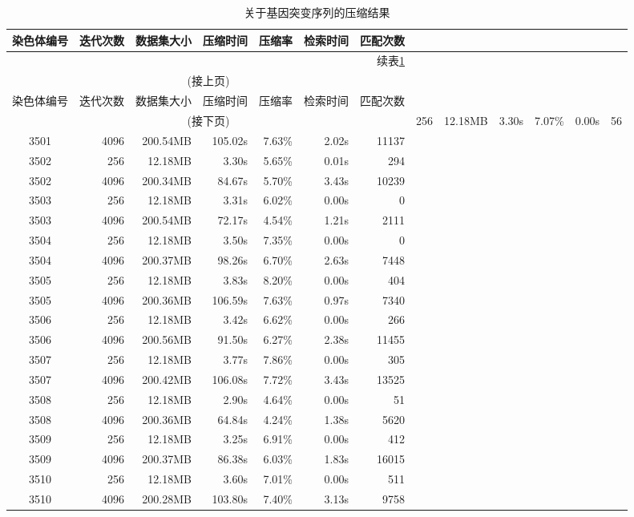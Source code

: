 ﻿\documentclass{sysuthesis}
\begin{document}
\begin{longtable}{crrrrrr}
	\caption{关于基因突变序列的压缩结果}\label{tab:dnacompress}\\
	\hline\hline
	染色体编号 & 迭代次数 & 数据集大小 & 压缩时间 & 压缩率 & 检索时间 & 匹配次数 \\
	\hline
	\endfirsthead
	\multicolumn{7}{r}{续表\ref{tab:dnacompress}}\\
	\multicolumn{7}{c}{(接上页)}\\
	\hline\hline
	染色体编号 & 迭代次数 & 数据集大小 & 压缩时间 & 压缩率 & 检索时间 & 匹配次数 \\
	\hline
	\endhead
	\hline
	\multicolumn{7}{c}{(接下页)}
	\endfoot
	\hline
	\endlastfoot
	3501 & 256 & 12.18MB & 3.30s & 7.07\% & 0.00s & 56 \\
	3501 & 4096 & 200.54MB & 105.02s & 7.63\% & 2.02s & 11137 \\
	3502 & 256 & 12.18MB & 3.30s & 5.65\% & 0.01s & 294 \\
	3502 & 4096 & 200.34MB & 84.67s & 5.70\% & 3.43s & 10239 \\
	3503 & 256 & 12.18MB & 3.31s & 6.02\% & 0.00s & 0 \\
	3503 & 4096 & 200.54MB & 72.17s & 4.54\% & 1.21s & 2111 \\
	3504 & 256 & 12.18MB & 3.50s & 7.35\% & 0.00s & 0 \\
	3504 & 4096 & 200.37MB & 98.26s & 6.70\% & 2.63s & 7448 \\
	3505 & 256 & 12.18MB & 3.83s & 8.20\% & 0.00s & 404 \\
	3505 & 4096 & 200.36MB & 106.59s & 7.63\% & 0.97s & 7340 \\
	3506 & 256 & 12.18MB & 3.42s & 6.62\% & 0.00s & 266 \\
	3506 & 4096 & 200.56MB & 91.50s & 6.27\% & 2.38s & 11455 \\
	3507 & 256 & 12.18MB & 3.77s & 7.86\% & 0.00s & 305 \\
	3507 & 4096 & 200.42MB & 106.08s & 7.72\% & 3.43s & 13525 \\
	3508 & 256 & 12.18MB & 2.90s & 4.64\% & 0.00s & 51 \\
	3508 & 4096 & 200.36MB & 64.84s & 4.24\% & 1.38s & 5620 \\
	3509 & 256 & 12.18MB & 3.25s & 6.91\% & 0.00s & 412 \\
	3509 & 4096 & 200.37MB & 86.38s & 6.03\% & 1.83s & 16015 \\
	3510 & 256 & 12.18MB & 3.60s & 7.01\% & 0.00s & 511 \\
	3510 & 4096 & 200.28MB & 103.80s & 7.40\% & 3.13s & 9758 \\

\end{longtable}
\end{document}
